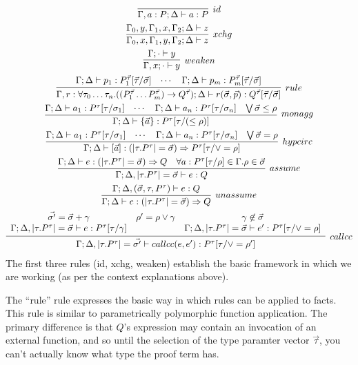 \begin{gather*}
  \infer[id]{\Gamma, a : P; \Delta \ds a : P}{}\\
  \infer[xchg]{\Gamma_0, x, \Gamma_1, y, \Gamma_2; \Delta \ds z}{\Gamma_0, y, \Gamma_1, x, \Gamma_2; \Delta \ds z}\\
  \infer[weaken]{\Gamma, x; \cdot \ds y}{\Gamma; \cdot \ds y}\\
  \infer[rule]{\Gamma, r : \forall \tau_0 \ldots \tau_n. ((P_1^{\vec{\tau}} \ldots P_m^{\vec{\tau}}) \rightarrow Q^{\vec{\tau}}); \Delta \ds r(\vec{\sigma}, \vec{p}) : Q^{\vec{\tau}}[\vec{\tau}/\vec{\sigma}]}{\Gamma; \Delta \ds p_1 : P_1^{\vec{\tau}}[\vec{\tau}/\vec{\sigma}] & \cdots & \Gamma; \Delta \ds p_m : P_m^{\vec{\tau}}[\vec{\tau}/\vec{\sigma}]}\\
  \infer[monagg]{\Gamma; \Delta \ds \{\vec{a}\} : P^\tau[\tau/(\leq \rho)]}{\Gamma; \Delta \ds a_1 : P^\tau[\tau/\sigma_1] & \cdots & \Gamma; \Delta \ds a_n : P^\tau[\tau/\sigma_n] & \bigvee \vec{\sigma} \leq \rho}\\
  \infer[hypcirc]{\Gamma; \Delta\vdash [\vec{a}] : (|\tau. P^\tau| = \vec{\sigma}) \Rightarrow P^\tau[\tau/\vee = \rho]}{\Gamma; \Delta \ds a_1 : P^\tau[\tau/\sigma_1] & \cdots & \Gamma; \Delta \ds a_n : P^\tau[\tau/\sigma_n] & \bigvee \vec{\sigma} = \rho}\\
  \infer[assume]{\Gamma; \Delta,  |\tau. P^\tau| = \vec{\sigma} \ds e : Q}{\Gamma; \Delta \ds e: (|\tau. P^\tau| = \vec{\sigma}) \Rightarrow Q & \forall a : P^\tau[\tau/\rho] \in \Gamma. \rho \in \vec{\sigma}}\\
  \infer[unassume]{\Gamma; \Delta \ds e : (|\tau. P^\tau| = \vec{\sigma}) \Rightarrow Q}{\Gamma; \Delta, (\vec{\sigma}, \tau, P^\tau) \ds e : Q}\\
  \infer[callcc]{\Gamma; \Delta, |\tau. P^\tau| = \vec{\sigma'} \ds callcc(e, e') : P^\tau[\tau/\vee = \rho']}{
    \begin{array}{ccc}
      \vec{\sigma'} = \vec{\sigma} + \gamma & \rho' = \rho \vee \gamma & \gamma \not \in \vec{\sigma} \\
      \Gamma; \Delta, |\tau. P^\tau| = \vec{\sigma} \ds e : P^\tau[\tau/\gamma] & & \Gamma; \Delta, |\tau.P^\tau|=\vec{\sigma} \ds e' : P^\tau[\tau/\vee = \rho]
  \end{array}}
\end{gather*}
The first three rules (id, xchg, weaken) establish the basic framework in which we are working (as per the context explanations above).

The ``rule'' rule expresses the basic way in which rules can be applied to facts.
This rule is similar to parametrically polymorphic function application.
The primary difference is that $Q$'s expression may contain an invocation of an external function, and so until the selection of the type paramter vector $\vec{\tau}$, you can't actually know what type the proof term has.

